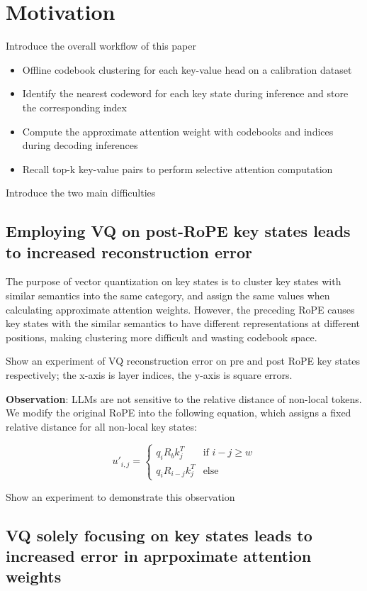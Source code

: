\section{Motivation}

Introduce the overall workflow of this paper

\begin{itemize}
    \item Offline codebook clustering for each key-value head on a calibration dataset
    \item Identify the nearest codeword for each key state during inference and store the corresponding index
    \item Compute the approximate attention weight with codebooks and indices during decoding inferences
    \item Recall top-k key-value pairs to perform selective attention computation
\end{itemize}

Introduce the two main difficulties

\subsection{Employing VQ on post-RoPE key states leads to increased reconstruction error}

The purpose of vector quantization on key states is to cluster key states with similar semantics into the same category, and assign the same values when calculating approximate attention weights. 
However, the preceding RoPE causes key states with the similar semantics to have different representations at different positions, making clustering more difficult and wasting codebook space.

Show an experiment of VQ reconstruction error on pre and post RoPE key states respectively; the x-axis is layer indices, the y-axis is square errors.

\textbf{Observation}: LLMs are not sensitive to the relative distance of non-local tokens.
We modify the original RoPE into the following equation, which assigns a fixed relative distance for all non-local key states:

\begin{equation}
    u'_{i,j} =
    \begin{cases} 
        q_i R_b {k}_j^T & \text{if } i - j \ge w \\
        {q}_i R_{i-j} {k}_j^T & \text{else}
    \end{cases}
\end{equation}

Show an experiment to demonstrate this observation

\subsection{VQ solely focusing on key states leads to increased error in aprpoximate attention weights}

